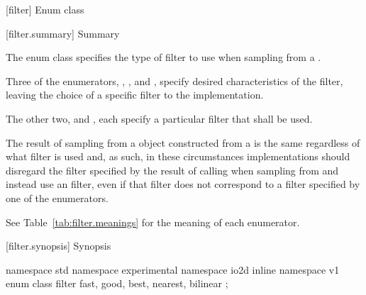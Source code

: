  [filter] {Enum class }

 [filter.summary] { Summary}

\pnum
The  enum class specifies the type of filter to use when sampling from a \pixmap.

\pnum
Three of the  enumerators, , , and , specify desired characteristics of the filter, leaving the choice of a specific filter to the implementation. 

The other two,  and , each specify a particular filter that shall be used.

\pnum
The result of sampling from a  object  constructed from a  is the same regardless of what filter is used and, as such, in these circumstances implementations should disregard the filter specified by the result of calling  when sampling from  and instead use an \unspecnorm filter, even if that filter does not correspond to a filter specified by one of the  enumerators.

\pnum
See Table~\ref{tab:filter.meanings} for the meaning of each
 enumerator.

 [filter.synopsis] { Synopsis}

\begin{codeblock}
namespace std { namespace experimental { namespace io2d { inline namespace v1 {
  enum class filter {
    fast,
    good,
    best,
    nearest,
    bilinear
  };
} } } }
\end{codeblock}

